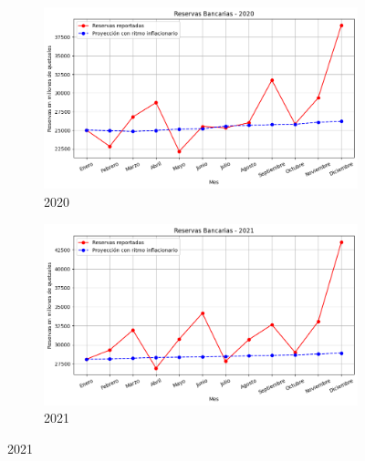 \begin{figure}[H]
  \begin{subfigure}[b]{0.495\textwidth}
    \includegraphics[width=\linewidth]{imagenes/reservas_2020.png}
    \caption{2020}
  \end{subfigure}
  \begin{subfigure}[b]{0.495\textwidth}
    \includegraphics[width=\linewidth]{imagenes/reservas_2021.png}
    \caption{2021}
  \end{subfigure}
  

\end{figure}

